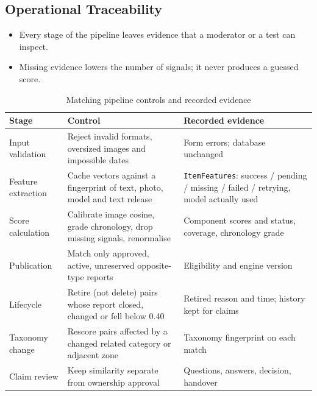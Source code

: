 \documentclass[12pt,a4paper,oneside]{report}
\newcommand{\code}[1]{\texttt{#1}}
\begin{document}
\subsection{Operational Traceability}
\begin{itemize}
  \item Every stage of the pipeline leaves evidence that a moderator or a test can inspect.
  \item Missing evidence lowers the number of signals; it never produces a guessed score.
\end{itemize}
\begin{table}[H]
\centering\small
\caption{Matching pipeline controls and recorded evidence}
\begin{tabularx}{\textwidth}{P{28mm}X X}
\toprule
Stage & Control & Recorded evidence\\
\midrule
Input validation & Reject invalid formats, oversized images and impossible dates & Form errors; database unchanged\\
Feature extraction & Cache vectors against a fingerprint of text, photo, model and text release & \code{ItemFeatures}: success / pending / missing / failed / retrying, model actually used\\
Score calculation & Calibrate image cosine, grade chronology, drop missing signals, renormalise & Component scores and status, coverage, chronology grade\\
Publication & Match only approved, active, unreserved opposite-type reports & Eligibility and engine version\\
Lifecycle & Retire (not delete) pairs whose report closed, changed or fell below 0.40 & Retired reason and time; history kept for claims\\
Taxonomy change & Rescore pairs affected by a changed related category or adjacent zone & Taxonomy fingerprint on each match\\
Claim review & Keep similarity separate from ownership approval & Questions, answers, decision, handover\\
\bottomrule
\end{tabularx}
\end{table}
\end{document}
